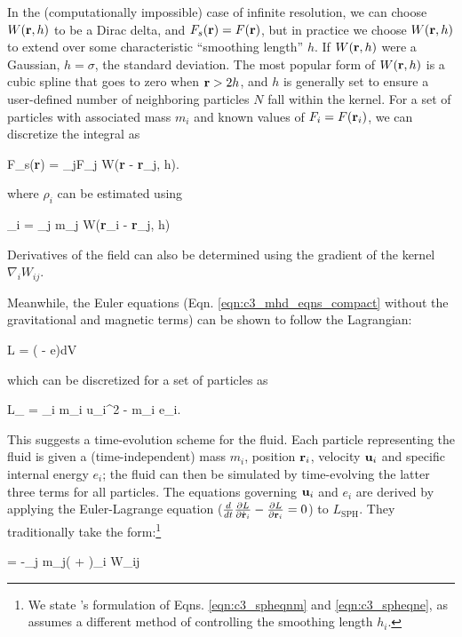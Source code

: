 \noindent In the (computationally impossible) case of infinite resolution, we can choose $W({\bf r}, h)$ to be a Dirac delta, and $F_s({\bf r}) = F({\bf r})$, but in practice we choose $W({\bf r}, h)$ to extend over some characteristic ``smoothing length'' $h$.  If $W({\bf r}, h)$ were a Gaussian, $h = \sigma$, the standard deviation.  The most popular form of $W({\bf r}, h)$ is a cubic spline that goes to zero when ${\bf r} > 2h$, and $h$ is generally set to ensure a user-defined number of neighboring particles $N$ fall within the kernel.  For a set of particles with associated mass $m_i$ and known values of $F_i = F({\bf r}_i)$, we can discretize the integral as

\eqbegin
F_s({\bf r}) = \sum_jF_j W({\bf r} - {\bf r}_j, h).
\label{eq:c3_kernelavg}
\eqend

\noindent where $\rho_i$ can be estimated using 

\eqbegin
\rho_i = \sum_j m_j W({\bf r}_i - {\bf r}_j, h)
\label{eq:c3_kernelavg_rho}
\eqend

\noindent Derivatives of the field can also be determined using the gradient of the kernel $\nabla_i W_{ij}$.

Meanwhile, the Euler equations (Eqn. \ref{eqn:c3_mhd_eqns_compact} without the gravitational and magnetic terms) can be shown to follow the Lagrangian:

\eqbegin
L = \int \rho\left( - e\right)dV
\label{eqn:c3_lagrangian}
\eqend

\noindent which can be discretized for a set of particles as

\eqbegin
L_ = \sum_i m_i u_i^2 - m_i e_i.
\eqend

\noindent This suggests a time-evolution scheme for the fluid.  Each particle representing the fluid is given a (time-independent) mass $m_i$, position ${\bf r}_i$, velocity ${\bf u}_i$ and specific internal energy $e_i$; the fluid can then be simulated by time-evolving the latter three terms for all particles.  The equations governing ${\bf u}_i$ and $e_i$ are derived by applying the Euler-Lagrange equation ($\frac{d}{dt}\frac{\partial L}{\partial \dot{{\bf r}}_i} - \frac{\partial L}{\partial {\bf r}_i} = 0$) to $L_\mathrm{SPH}$.  They traditionally take the form:\footnote{We state \cite{wadssq04}'s formulation of Eqns. \ref{eqn:c3_spheqnm} and \ref{eqn:c3_spheqne}, as \cite{spri10rev} assumes a different method of controlling the smoothing length $h_i$.}

\eqbegin
{} = -\sum_j m_j\left( +  \right)\nabla_i W_{ij}
\label{eqn:c3_spheqnm}
\eqend

